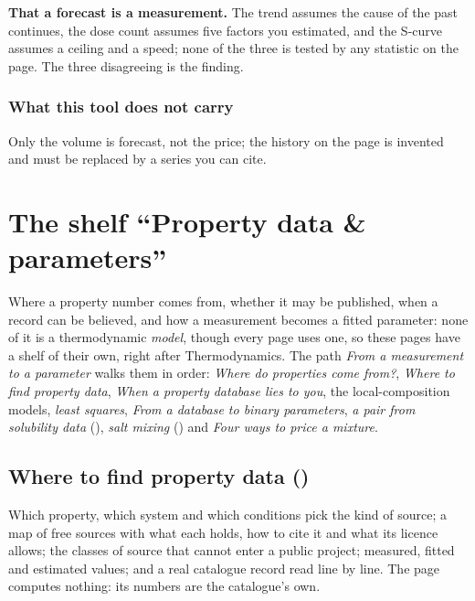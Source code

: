 \documentclass[11pt,a4paper]{article}
\begin{document}
\begin{pitfall}
\textbf{That a forecast is a measurement.}  The trend assumes the cause of the
past continues, the dose count assumes five factors you estimated, and the
S-curve assumes a ceiling and a speed; none of the three is tested by any
statistic on the page.  The three disagreeing is the finding.
\end{pitfall}

\subsubsection*{What this tool does not carry}

Only the volume is forecast, not the price; the history on the page is invented
and must be replaced by a series you can cite.

\section{The shelf ``Property data \& parameters''}\label{sec:edu-property-data}

Where a property number comes from, whether it may be published, when a
record can be believed, and how a measurement becomes a fitted parameter:
none of it is a thermodynamic \emph{model}, though every page uses one, so
these pages have a shelf of their own, right after Thermodynamics.  The
path \emph{From a measurement to a parameter} walks them in order:
\emph{Where do properties come from?}, \emph{Where to find property data},
\emph{When a property database lies to you}, the local-composition models,
\emph{least squares}, \emph{From a database to binary parameters},
\emph{a pair from solubility data} (), \emph{salt mixing}
() and \emph{Four ways to price a mixture}.

\subsection*{Where to find property data \quad()}
Which property, which system and which conditions pick the kind of source;
a map of free sources with what each holds, how to cite it and what its
licence allows; the classes of source that cannot enter a public project;
measured, fitted and estimated values; and a real catalogue record read line
by line.  The page computes nothing: its numbers are the catalogue's own.
\end{document}
